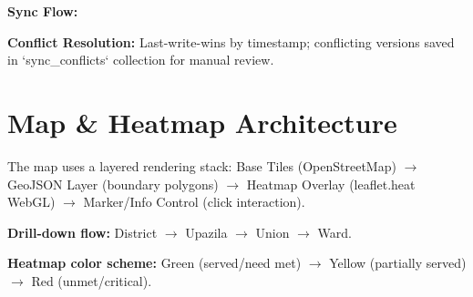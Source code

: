 \textbf{Sync Flow:}
\begin{center}
\label{fig:sync-flow}
\end{center}

\textbf{Conflict Resolution:} Last-write-wins by timestamp; conflicting versions saved in `sync\_conflicts` collection for manual review.

\section{Map \& Heatmap Architecture}
The map uses a layered rendering stack: Base Tiles (OpenStreetMap) $\rightarrow$ GeoJSON Layer (boundary polygons) $\rightarrow$ Heatmap Overlay (leaflet.heat WebGL) $\rightarrow$ Marker/Info Control (click interaction).

\textbf{Drill-down flow:} District $\rightarrow$ Upazila $\rightarrow$ Union $\rightarrow$ Ward.

\textbf{Heatmap color scheme:} Green (served/need met) $\rightarrow$ Yellow (partially served) $\rightarrow$ Red (unmet/critical).
